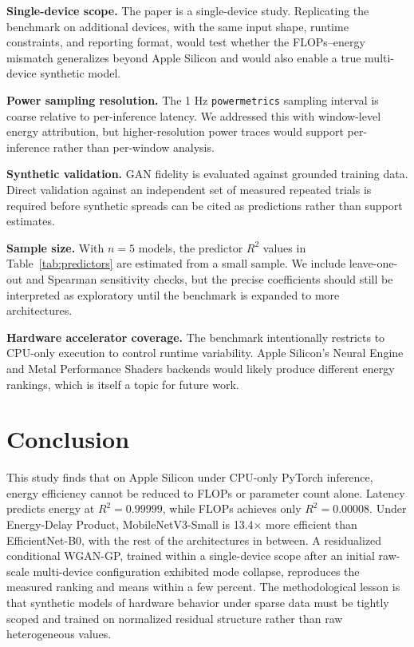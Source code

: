 \documentclass[conference]{IEEEtran}
\begin{document}
\textbf{Single-device scope.} The paper is a single-device study. Replicating
the benchmark on additional devices, with the same input shape, runtime
constraints, and reporting format, would test whether the FLOPs--energy
mismatch generalizes beyond Apple Silicon and would also enable a true
multi-device synthetic model.

\textbf{Power sampling resolution.} The 1 Hz \texttt{powermetrics} sampling
interval is coarse relative to per-inference latency. We addressed this with
window-level energy attribution, but higher-resolution power traces would
support per-inference rather than per-window analysis.

\textbf{Synthetic validation.} GAN fidelity is evaluated against grounded
training data. Direct validation against an independent set of measured
repeated trials is required before synthetic spreads can be cited as
predictions rather than support estimates.

\textbf{Sample size.} With $n = 5$ models, the predictor $R^2$ values in
Table~\ref{tab:predictors} are estimated from a small sample. We include
leave-one-out and Spearman sensitivity checks, but the precise coefficients
should still be interpreted as exploratory until the benchmark is expanded to
more architectures.

\textbf{Hardware accelerator coverage.} The benchmark intentionally restricts
to CPU-only execution to control runtime variability. Apple Silicon's Neural
Engine and Metal Performance Shaders backends would likely produce different
energy rankings, which is itself a topic for future work.

\section{Conclusion}
This study finds that on Apple Silicon under CPU-only PyTorch inference,
energy efficiency cannot be reduced to FLOPs or parameter count alone.
Latency predicts energy at $R^2 = 0.99999$, while FLOPs achieves only
$R^2 = 0.00008$. Under Energy-Delay Product, MobileNetV3-Small is 13.4$\times$
more efficient than EfficientNet-B0, with the rest of the architectures in
between. A residualized conditional WGAN-GP, trained within a single-device
scope after an initial raw-scale multi-device configuration exhibited mode
collapse, reproduces the measured ranking and means within a few percent.
The methodological lesson is that synthetic models of hardware behavior
under sparse data must be tightly scoped and trained on normalized residual
structure rather than raw heterogeneous values.
\end{document}
